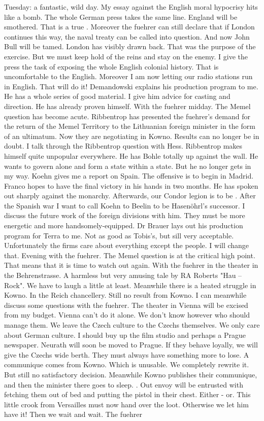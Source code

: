 Tuesday: a fantastic, wild day. My essay against the English moral hypocrisy hits like a bomb. The whole German press takes the same line. England will be smothered. That is a true . Moreover the fuehrer can still declare that if London continues this way, the naval treaty can be called into question. And now John Bull will be tamed. London has visibly drawn back. That was the purpose of the exercise. But we must keep hold of the reins and stay on the enemy. I give the press the task of exposing the whole English colonial history. That is uncomfortable to the English. Moreover I am now letting our radio stations run in English. That will do it! Demandowski explains his production program to me. He has a whole series of good material. I give him advice for casting and direction. He has already proven himself. With the fuehrer midday. The Memel question has become acute. Ribbentrop has presented the fuehrer's demand for the return of the Memel Territory to the Lithuanian foreign minister in the form of an ultimatum. Now they are negotiating in Kowno. Results can no longer be in doubt. I talk through the Ribbentrop question with Hess. Ribbentrop makes himself quite unpopular everywhere. He has Bohle totally up against the wall. He wants to govern alone and form a state within a state. But he no longer gets in my way. Koehn gives me a report on Spain. The offensive is to begin in Madrid. Franco hopes to have the final victory in his hands in two months. He has spoken out sharply against the monarchy. Afterwards, our Condor legion is to be . After the Spanish war I want to call Koehn to Beelin to be Hasenöhrl's successor. I discuss the future work of the foreign divisions with him. They must be more energetic and more handsomely-equipped. Dr Brauer lays out his production program for Terra to me. Not as good as Tobis's, but sill very acceptable. Unfortunately the firms care about everything except the people. I will change that. Evening with the fuehrer. The Memel question is at the critical high point. That means that it is time to watch out again. With the fuehrer in the theater in the Behrenstrasse.  A harmless but very amusing tale by RA Roberts "Hau -- Rock". We have to laugh a little at least. Meanwhile there is a heated struggle in Kowno. In the Reich chancellery. Still no result from Kowno. I can meanwhile discuss some questions with the fuehrer. The theater in Vienna will be excised from my budget. Vienna can't do it alone. We don't know however who should manage them. We leave the Czech culture to the Czechs themselves. We only care about German culture. I should buy up the film studio and perhaps a Prague newspaper. Neurath will soon be moved to Prague. If they behave loyally, we will give the Czechs wide berth. They must always have something more to lose. A communique comes from Kowno. Which is unusable. We completely rewrite it. But still no satisfactory decision. Meanwhile Kowno publishes their communique, and then the minister there goes to sleep. . Out envoy will be entrusted with fetching them out of bed and putting the pistol in their chest. Either - or. This little crook from Versailles must now hand over the loot. Otherwise we let him have it! Then we wait and wait. The fuehrer 